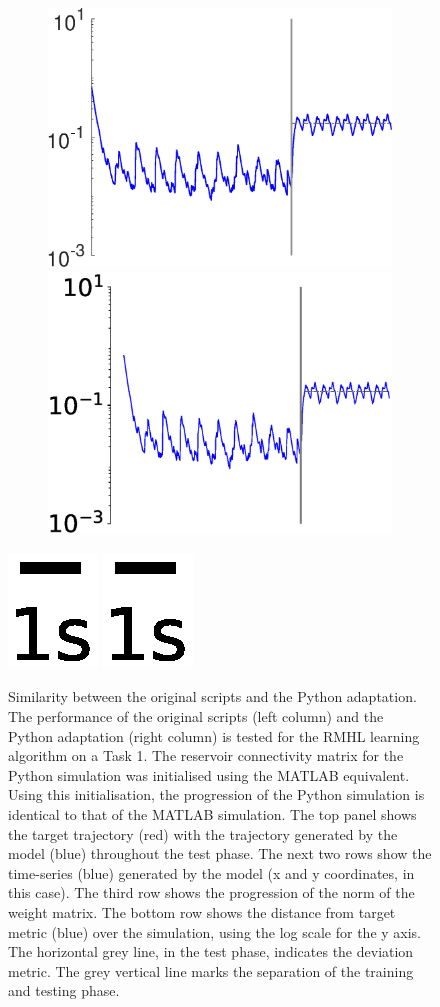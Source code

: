 \begin{figure}[h]
\begin{subfigure}{\textwidth}
        \hspace{.5em}
        \includegraphics[trim=0cm 0cm 0cm 0cm,clip=true,height=0.15\linewidth,width=.45\linewidth]{Figures/Fig_T7/MATLAB/RHML_T1_Jmat_MSE.eps}
        \hspace{1em}
        \includegraphics[trim=0cm 0cm 0cm 0cm,clip=true,clip=true,height=0.15\linewidth,width=.45\linewidth]{Figures/Fig_T7/Python/RMHL_T1_Jmat_MSE.eps}
    
    \end{subfigure}
        
            

        
    
        
        \includegraphics[trim=2cm 6cm 2cm 6cm, clip=true,height=0.05\linewidth,width=.4\linewidth]{Figures/Fig_T1/Python/ST_T1_Scale.eps}
        \includegraphics[trim=2cm 4cm 2cm 6cm, clip=true,height=0.05\linewidth,width=.45\linewidth]{Figures/Fig_T1/Python/ST_T1_Scale.eps}


\caption{Similarity between the original scripts and the Python adaptation. The performance of the original scripts (left column) and the Python adaptation (right column) is tested for the RMHL learning algorithm on a Task 1. The reservoir connectivity matrix for the Python simulation was initialised using the MATLAB equivalent. Using this initialisation, the progression of the Python simulation is identical to that of the MATLAB simulation. The top panel shows the target trajectory (red) with the trajectory generated by the model (blue) throughout the test phase. The next two rows show the time-series (blue) generated by the model (x and y coordinates, in this case). The third row shows the progression of the norm of the weight matrix. The bottom row shows the distance from target metric (blue) over the simulation, using the log scale for the y axis. The horizontal grey line, in the test phase, indicates the deviation metric. The grey vertical line marks the separation of the training and testing phase.}
\label{Fig:Comparison_sprandn}

\end{figure}
